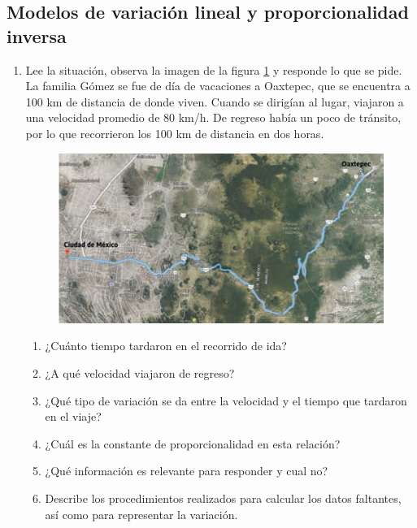 \documentclass[11pt]{book}
\begin{document}
\subsection{Modelos de variación lineal y proporcionalidad inversa}
\begin{enumerate}

  \item Lee la situación, observa la imagen de la figura \ref{fig:mapa} y responde lo que se pide.\\
        La familia Gómez se fue de día de vacaciones a Oaxtepec, que se encuentra a 100 km de distancia de donde viven. Cuando se dirigían al lugar, viajaron a una velocidad promedio de 80 km/h.
        De regreso había un poco de tránsito, por lo que recorrieron los 100 km de distancia en dos horas.
        \begin{figure}[H]
          \centering
          \includegraphics[width=0.75\linewidth]{mapa}
          \label{fig:mapa}
        \end{figure}%
        \begin{enumerate}
          \item ¿Cuánto tiempo tardaron en el recorrido de ida?
          \item ¿A qué velocidad viajaron de regreso?
          \item ¿Qué tipo de variación se da entre la velocidad y el tiempo que tardaron en el viaje?
          \item ¿Cuál es la constante de proporcionalidad en esta relación?
          \item ¿Qué información es relevante para responder y cual no?
          \item Describe los procedimientos realizados para calcular los datos faltantes, así como para representar la variación.
        \end{enumerate}


\end{enumerate}
\end{document}
